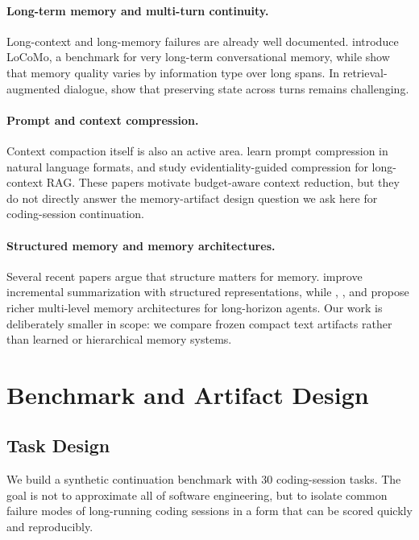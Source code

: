 \documentclass[11pt]{article}
\begin{document}
\paragraph{Long-term memory and multi-turn continuity.}
Long-context and long-memory failures are already well documented. \citet{maharana-etal-2024-evaluating} introduce LoCoMo, a benchmark for very long-term conversational memory, while \citet{jia-etal-2025-evaluating} show that memory quality varies by information type over long spans. In retrieval-augmented dialogue, \citet{katsis-etal-2025-mt} show that preserving state across turns remains challenging.

\paragraph{Prompt and context compression.}
Context compaction itself is also an active area. \citet{chuang-etal-2024-learning} learn prompt compression in natural language formats, and \citet{jeong-etal-2025-ecorag} study evidentiality-guided compression for long-context RAG. These papers motivate budget-aware context reduction, but they do not directly answer the memory-artifact design question we ask here for coding-session continuation.

\paragraph{Structured memory and memory architectures.}
Several recent papers argue that structure matters for memory. \citet{hwang-etal-2024-enhancing} improve incremental summarization with structured representations, while \citet{kang-etal-2025-memory}, \citet{hu-etal-2025-hiagent}, and \citet{sun-etal-2026-h} propose richer multi-level memory architectures for long-horizon agents. Our work is deliberately smaller in scope: we compare frozen compact text artifacts rather than learned or hierarchical memory systems.

\section{Benchmark and Artifact Design}
\subsection{Task Design}
We build a synthetic continuation benchmark with 30 coding-session tasks. The goal is not to approximate all of software engineering, but to isolate common failure modes of long-running coding sessions in a form that can be scored quickly and reproducibly.
\end{document}
